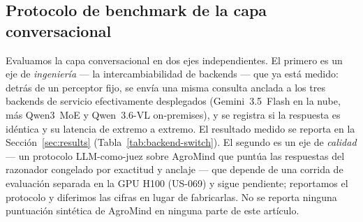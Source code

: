 \subsection{Protocolo de benchmark de la capa conversacional}
\label{sec:experiments-llm}
Evaluamos la capa conversacional en dos ejes independientes. El primero
es un eje de \emph{ingeniería} --- la intercambiabilidad de backends ---
que ya está medido: detrás de un perceptor fijo, se envía una misma
consulta anclada a los tres backends de servicio efectivamente
desplegados (Gemini~3.5~Flash en la nube, más Qwen3~MoE y
Qwen~3.6-VL on-premises), y se registra si la respuesta es idéntica y su
latencia de extremo a extremo. El resultado medido se reporta en la
Sección~\ref{sec:results} (Tabla~\ref{tab:backend-switch}). El segundo es
un eje de \emph{calidad} --- un protocolo LLM-como-juez sobre AgroMind que
puntúa las respuestas del razonador congelado por exactitud y anclaje ---
que depende de una corrida de evaluación separada en la GPU H100 (US-069)
y sigue pendiente; reportamos el protocolo y diferimos las cifras en
lugar de fabricarlas. No se reporta ninguna puntuación sintética de
AgroMind en ninguna parte de este artículo.
